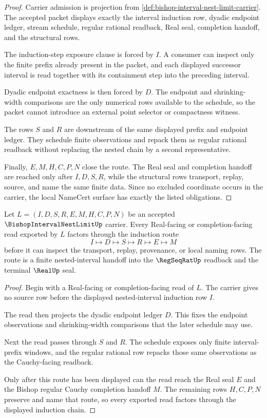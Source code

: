 \begin{proof}
Carrier admission is projection from \autoref{def:bishop-interval-nest-limit-carrier}. The accepted packet displays exactly the interval induction row, dyadic endpoint ledger, stream schedule, regular rational readback, Real seal, completion handoff, and the structural rows.

The induction-step exposure clause is forced by $I$. A consumer can inspect only the finite prefix already present in the packet, and each displayed successor interval is read together with its containment step into the preceding interval.

Dyadic endpoint exactness is then forced by $D$. The endpoint and shrinking-width comparisons are the only numerical rows available to the schedule, so the packet cannot introduce an external point selector or compactness witness.

The rows $S$ and $R$ are downstream of the same displayed prefix and endpoint ledger. They schedule finite observations and repack them as regular rational readback without replacing the nested chain by a second representative.

Finally, $E,M,H,C,P,N$ close the route. The Real seal and completion handoff are reached only after $I,D,S,R$, while the structural rows transport, replay, source, and name the same finite data. Since no excluded coordinate occurs in the carrier, the local NameCert surface has exactly the listed obligations.
\end{proof}

\begin{theorem}
\label{thm:bishop-interval-nest-limit-convergence-route}
Let $L=(I,D,S,R,E,M,H,C,P,N)$ be an accepted $\BishopIntervalNestLimitUp$ carrier. Every Real-facing or completion-facing read exported by $L$ factors through the induction route
$$
I\longmapsto D\longmapsto S\longmapsto R\longmapsto E\longmapsto M
$$
before it can inspect the transport, replay, provenance, or local naming rows. The route is a finite nested-interval handoff into the $\RegSeqRatUp$ readback and the terminal $\RealUp$ seal.
\end{theorem}
\begin{proof}
Begin with a Real-facing or completion-facing read of $L$. The carrier gives no source row before the displayed nested-interval induction row $I$.

The read then projects the dyadic endpoint ledger $D$. This fixes the endpoint observations and shrinking-width comparisons that the later schedule may use.

Next the read passes through $S$ and $R$. The schedule exposes only finite interval-prefix windows, and the regular rational row repacks those same observations as the Cauchy-facing readback.

Only after this route has been displayed can the read reach the Real seal $E$ and the Bishop regular Cauchy completion handoff $M$. The remaining rows $H,C,P,N$ preserve and name that route, so every exported read factors through the displayed induction chain.
\end{proof}

